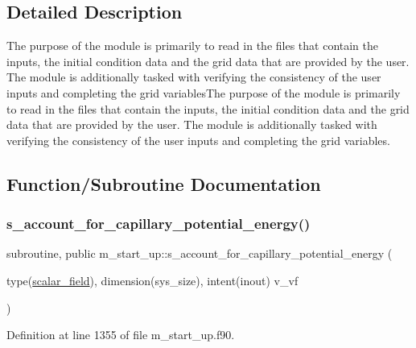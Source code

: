 \subsection{Detailed Description}
The purpose of the module is primarily to read in the files that contain the inputs, the initial condition data and the grid data that are provided by the user. The module is additionally tasked with verifying the consistency of the user inputs and completing the grid variables\+The purpose of the module is primarily to read in the files that contain the inputs, the initial condition data and the grid data that are provided by the user. The module is additionally tasked with verifying the consistency of the user inputs and completing the grid variables. 

\subsection{Function/\+Subroutine Documentation}
\mbox{\label{namespacem__start__up_a7e47c12de90e408e70de7da3f2d24e28}} 
\subsubsection{\texorpdfstring{s\+\_\+account\+\_\+for\+\_\+capillary\+\_\+potential\+\_\+energy()}{s\_account\_for\_capillary\_potential\_energy()}}
{\footnotesize\ttfamily subroutine, public m\+\_\+start\+\_\+up\+::s\+\_\+account\+\_\+for\+\_\+capillary\+\_\+potential\+\_\+energy (\begin{DoxyParamCaption}\item[{type(\hyperlink{structm__derived__types_1_1scalar__field}{scalar\+\_\+field}), dimension(sys\+\_\+size), intent(inout)}]{v\+\_\+vf }\end{DoxyParamCaption})}



Definition at line 1355 of file m\+\_\+start\+\_\+up.\+f90.

\mbox{\label{namespacem__start__up_ab5f7e03f1da1999ee699cec4f26370e0}} 
